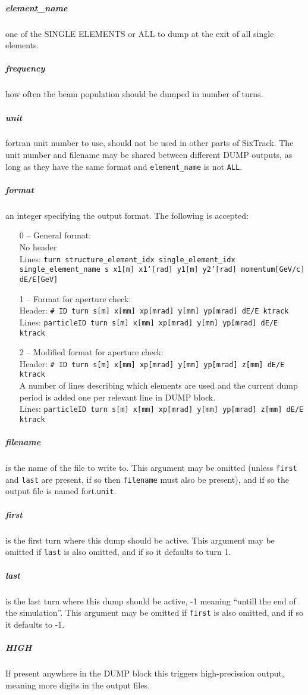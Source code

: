 \documentclass[a4paper,11pt]{report}
\begin{document}
\subparagraph{element\_name}
one of the SINGLE ELEMENTS or ALL to dump at the exit of all single elements.
\subparagraph{frequency}
how often the beam population should be dumped in number of turns.
\subparagraph{unit}
fortran unit number to use, should not be used in other parts of SixTrack.
The unit number and filename may be shared between different DUMP outputs, as long as they have the same format and \texttt{element\_name} is not \texttt{ALL}.
\subparagraph{format}
an integer specifying the output format. The following is accepted:
\begin{enumerate}
	\item[0] -- General format:\\
	No header\\
	Lines: \texttt{turn structure\_element\_idx single\_element\_idx single\_element\_name s x1[m] x1'[rad] y1[m] y2'[rad] momentum[GeV/c] dE/E[GeV]}
	\item[1] -- Format for aperture check:\\
	Header: \texttt{\# ID turn s[m] x[mm] xp[mrad] y[mm] yp[mrad] dE/E ktrack}\\
	Lines: \texttt{particleID turn s[m] x[mm] xp[mrad] y[mm] yp[mrad] dE/E ktrack}
	\item[2] -- Modified format for aperture check:\\  
	Header: \texttt{\# ID turn s[m] x[mm] xp[mrad] y[mm] yp[mrad] z[mm] dE/E ktrack}\\
	A number of lines describing which elements are used and the current dump period is added one per relevant line in DUMP block.\\
	Lines: \texttt{particleID turn s[m] x[mm] xp[mrad] y[mm] yp[mrad] z[mm] dE/E ktrack}
\end{enumerate}

\subparagraph{filename} is the name of the file to write to. This argument may be omitted (unless \texttt{first} and \texttt{last} are present, if so then \texttt{filename} must also be present), and if so the output file is named fort.\texttt{unit}.

\subparagraph{first} is the first turn where this dump should be active. This argument may be omitted if \texttt{last} is also omitted, and if so it defaults to turn 1.

\subparagraph{last} is the last turn where this dump should be active, -1 meaning ``untill the end of the simulation''. This argument may be omitted if \texttt{first} is also omitted, and if so it defaults to -1.

\subparagraph{HIGH} If present anywhere in the DUMP block this triggers high-precission output, meaning more digits in the output files.
\end{document}

